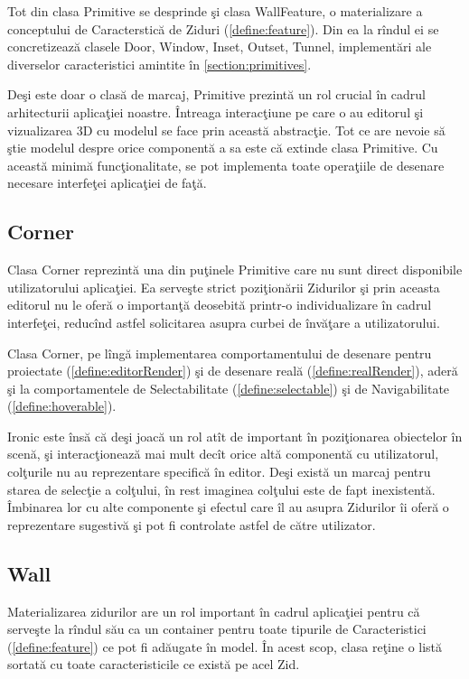 Tot din clasa Primitive se desprinde şi clasa WallFeature, o materializare a 
conceptului de Caracterstică de Ziduri (\ref{define:feature}). Din ea la rîndul 
ei se concretizează clasele Door, Window, Inset, Outset, Tunnel, implementări 
ale diverselor caracteristici amintite în \ref{section:primitives}.

Deşi este doar o clasă de marcaj, Primitive prezintă un rol crucial în cadrul 
arhitecturii aplicaţiei noastre. Întreaga interacţiune pe care o au editorul şi 
vizualizarea 3D cu modelul se face prin această abstracţie. Tot ce are nevoie 
să ştie modelul despre orice componentă a sa este că extinde clasa Primitive. 
Cu această minimă funcţionalitate, se pot implementa toate operaţiile de 
desenare necesare interfeţei aplicaţiei de faţă.

\subsection{Corner}

Clasa Corner reprezintă una din puţinele Primitive care nu sunt direct 
disponibile utilizatorului aplicaţiei. Ea serveşte strict poziţionării 
Zidurilor şi prin aceasta editorul nu le oferă o importanţă deosebită printr-o 
individualizare în cadrul interfeţei, reducînd astfel solicitarea asupra curbei 
de învăţare a utilizatorului.

Clasa Corner, pe lîngă implementarea comportamentului de desenare pentru 
proiectate (\ref{define:editorRender}) şi de desenare reală 
(\ref{define:realRender}), aderă şi la comportamentele de Selectabilitate 
(\ref{define:selectable}) şi de Navigabilitate (\ref{define:hoverable}).

Ironic este însă că deşi joacă un rol atît de important în poziţionarea 
obiectelor în scenă, şi interacţionează mai mult decît orice altă componentă cu 
utilizatorul, colţurile nu au reprezentare specifică în editor. Deşi există un 
marcaj pentru starea de selecţie a colţului, în rest imaginea colţului este de 
fapt inexistentă. Îmbinarea lor cu alte componente şi efectul care îl au asupra
 Zidurilor îi oferă o reprezentare sugestivă şi pot fi controlate astfel de 
către utilizator.

\subsection{Wall}

Materializarea zidurilor are un rol important în cadrul aplicaţiei pentru că 
serveşte la rîndul său ca un container pentru toate tipurile de Caracteristici 
(\ref{define:feature}) ce pot fi adăugate în model. În acest scop, clasa reţine 
o listă sortată cu toate caracteristicile ce există pe acel Zid.

